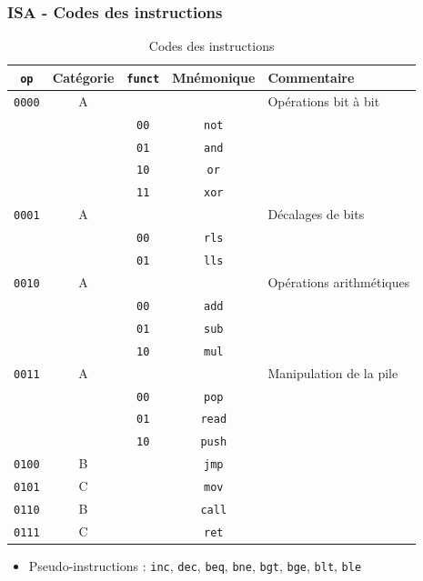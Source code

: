 \documentclass{beamer}
\begin{document}
\begin{frame}
\frametitle{ISA - Codes des instructions}
\begin{table}[ht]
    \centering
    \begin{tiny}
    \begin{tabular}{ccccl}
    \toprule
    \texttt{op} & Catégorie & \texttt{funct} & Mnémonique & Commentaire \\
    \midrule
    \texttt{0000} & A & & & Opérations bit à bit \\
    & & \texttt{00} & \texttt{not} & \\
    & & \texttt{01} & \texttt{and} & \\
    & & \texttt{10} & \texttt{or} & \\
    & & \texttt{11} & \texttt{xor} & \\
    \texttt{0001} & A & & & Décalages de bits \\
    & & \texttt{00} & \texttt{rls} & \\
    & & \texttt{01} & \texttt{lls} & \\
    \texttt{0010} & A & & & Opérations arithmétiques \\
    & & \texttt{00} & \texttt{add} & \\
    & & \texttt{01} & \texttt{sub} & \\
    & & \texttt{10} & \texttt{mul} & \\
    \texttt{0011} & A & & & Manipulation de la pile \\
    & & \texttt{00} & \texttt{pop} & \\
    & & \texttt{01} & \texttt{read} & \\
    & & \texttt{10} & \texttt{push} & \\
    \texttt{0100} & B & & \texttt{jmp} & \\
    \texttt{0101} & C & & \texttt{mov} & \\
    \texttt{0110} & B & & \texttt{call} & \\
    \texttt{0111} & C & & \texttt{ret} & \\
    \bottomrule
    \end{tabular}
    \end{tiny}
    \caption{Codes des instructions}
    \label{tab:opcodes}
\begin{itemize}
\item Pseudo-instructions : \texttt{inc}, \texttt{dec}, \texttt{beq},
    \texttt{bne}, \texttt{bgt}, \texttt{bge}, \texttt{blt}, \texttt{ble}
\end{itemize}
\end{table}
\end{frame}
\end{document}
